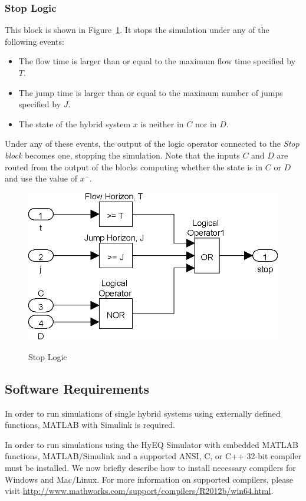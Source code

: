 \documentclass{article}
\begin{document}
\subsubsection{Stop Logic}

This block is shown in Figure~\ref{fig:StopLogic}. It stops the simulation under any of the
following events:
\begin{itemize}
\item The flow time is larger than or equal to the maximum flow time specified by $T$.
\item The jump time is larger than or equal to the maximum number of jumps specified by $J$.
\item The state of the hybrid system $x$ is neither in $C$ nor in $D$.
\end{itemize}
Under any of these events, the output of the logic operator
connected to the {\em Stop block} becomes one, stopping the simulation.
Note that the inputs $C$ and $D$ are routed from the output of the blocks computing whether the state is in $C$ or $D$ and use the value of $x^-$.

\begin{figure}[ht]
  \begin{center}
    {\includegraphics[width=.5\textwidth]{figures/Simulink/StopLogic.eps}}
   \caption{Stop Logic}
\label{fig:StopLogic}
  \end{center}
\end{figure}

%

\subsection{Software Requirements}
In order to run simulations of single hybrid systems using externally defined functions, MATLAB with Simulink is required.

In order to run simulations using the HyEQ Simulator with embedded MATLAB functions, MATLAB/Simulink and a supported ANSI, C, or C++ 32-bit compiler must be installed. We now briefly describe how to install necessary compilers for Windows and Mac/Linux. For more information on supported compilers, please visit \url{http://www.mathworks.com/support/compilers/R2012b/win64.html}.
\end{document}

